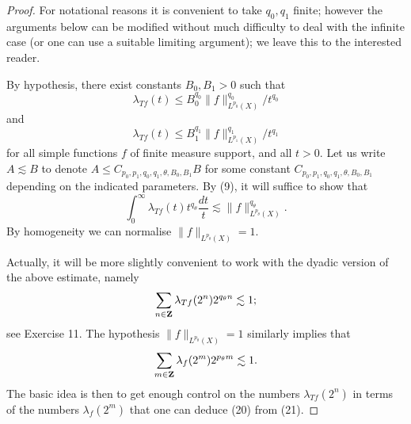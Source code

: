 \documentclass[10pt,reqno]{amsart}
\begin{document}
\begin{proof}

For notational reasons it is convenient to take $q_0, q_1$ finite; however the arguments below can be modified without much difficulty to deal with the infinite case (or one can use a suitable limiting argument); we leave this to the interested reader.

By hypothesis, there exist constants $B_0, B_1 > 0$ such that
%
\begin{equation} \lambda_{Tf}(t) \leq B_0^{q_0} \|f\|_{L^{p_0}(X)}^{q_0} / t^{q_0} \end{equation}
%
and
%
\begin{equation} \lambda_{Tf}(t) \leq B_1^{q_1} \|f\|_{L^{p_1}(X)}^{q_1} / t^{q_1} \end{equation}
%
for all simple functions $f$ of finite measure support, and all $t > 0$. Let us write $A \lesssim B$ to denote $A \leq C_{p_0,p_1,q_0,q_1,\theta,B_0,B_1} B$ for some constant $C_{p_0,p_1,q_0,q_1,\theta,B_0,B_1}$ depending on the indicated parameters. By (9), it will suffice to show that
%
\[ \int_0^\infty \lambda_{Tf}(t) t^{q_\theta} \frac{dt}{t} \lesssim \|f\|_{L^{p_\theta}(X)}^{q_\theta}.\]
%
By homogeneity we can normalise $\|f\|_{L^{p_\theta}(X)}=1$.

Actually, it will be more slightly convenient to work with the dyadic version of the above estimate, namely
%
\begin{equation} \sum_{n \in {\bf Z}} \lambda_{Tf}(2^n) 2^{q_\theta n} \lesssim 1; \end{equation}
%
see Exercise 11. The hypothesis $\|f\|_{L^{p_\theta}(X)}=1$ similarly implies that
%
\begin{equation} \sum_{m \in {\bf Z}} \lambda_f(2^m) 2^{p_\theta m} \lesssim 1. \end{equation}
%
The basic idea is then to get enough control on the numbers $\lambda_{Tf}(2^n)$ in terms of the numbers $\lambda_f(2^m)$ that one can deduce (20) from (21).


\end{proof}
\end{document}
